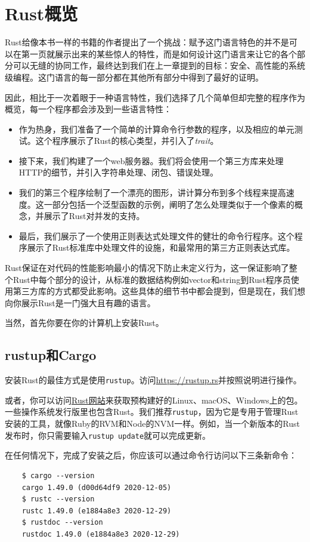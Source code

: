 \chapter{Rust概览}\label{ch02}
Rust给像本书一样的书籍的作者提出了一个挑战：赋予这门语言特色的并不是可以在第一页就展示出来的某些惊人的特性，而是如何设计这门语言来让它的各个部分可以无缝的协同工作，最终达到我们在上一章提到的目标：安全、高性能的系统级编程。这门语言的每一部分都在其他所有部分中得到了最好的证明。

因此，相比于一次着眼于一种语言特性，我们选择了几个简单但却完整的程序作为概览，每一个程序都会涉及到一些语言特性：

\begin{itemize}
    \item 作为热身，我们准备了一个简单的计算命令行参数的程序，以及相应的单元测试。这个程序展示了Rust的核心类型，并引入了\emph{trait}。
    \item 接下来，我们构建了一个web服务器。我们将会使用一个第三方库来处理HTTP的细节，并引入字符串处理、闭包、错误处理。
    \item 我们的第三个程序绘制了一个漂亮的图形，讲计算分布到多个线程来提高速度。这一部分包括一个泛型函数的示例，阐明了怎么处理类似于一个像素的概念，并展示了Rust对并发的支持。
    \item 最后，我们展示了一个使用正则表达式处理文件的健壮的命令行程序。这个程序展示了Rust标准库中处理文件的设施，和最常用的第三方正则表达式库。
\end{itemize}

Rust保证在对代码的性能影响最小的情况下防止未定义行为，这一保证影响了整个Rust中每个部分的设计，从标准的数据结构例如vector和string到Rust程序员使用第三方库的方式都受此影响。这些具体的细节书中都会提到，但是现在，我们想向你展示Rust是一门强大且有趣的语言。

当然，首先你要在你的计算机上安装Rust。

\section{rustup和Cargo}
安装Rust的最佳方式是使用\texttt{rustup}。访问\url{https://rustup.rs}并按照说明进行操作。

或者，你可以访问\href{https://www.rust-lang.org/}{Rust网站}来获取预构建好的Linux、macOS、Windows上的包。一些操作系统发行版里也包含Rust。我们推荐\texttt{rustup}，因为它是专用于管理Rust安装的工具，就像Ruby的RVM和Node的NVM一样。例如，当一个新版本的Rust发布时，你只需要输入\texttt{rustup update}就可以完成更新。

在任何情况下，完成了安装之后，你应该可以通过命令行访问以下三条新命令：
\begin{verbatim}
    $ cargo --version
    cargo 1.49.0 (d00d64df9 2020-12-05)
    $ rustc --version
    rustc 1.49.0 (e1884a8e3 2020-12-29)
    $ rustdoc --version
    rustdoc 1.49.0 (e1884a8e3 2020-12-29)
\end{verbatim}

